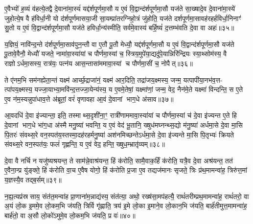 ए॒वैभ्यो॑ ह॒व्यं व॑हत्ये॒तद्वै दे॒वाना॑मा॒स्यं॑ यद्द॑र्\mbox{}शपूर्णमा॒सौ य ए॒वं वि॒द्वान्द॑र्\mbox{}शपूर्णमा॒सौ यज॑ते सा॒ख्षादे॒व दे॒वाना॑मा॒स्ये॑ जुहोत्ये॒ष वै ह॑विर्धा॒नी यो द॑र्\mbox{}शपूर्णमासया॒जी सा॒यम्प्रा॑तरग्निहो॒त्रं जु॑होति॒ यज॑ते दर्\mbox{}शपूर्णमा॒सावह॑रहर्\mbox{}हविर्धा॒निनाꣳ॑ सु॒तो य ए॒वं वि॒द्वान्द॑र्\mbox{}शपूर्णमा॒सौ यज॑ते हविर्धा॒न्य॑स्मीति॒ सर्व॑मे॒वास्य॑ बर्\mbox{}हि॒ष्यं॑ द॒त्तम्भ॑वति दे॒वा वा अहः॑॥३५॥

य॒ज्ञियं॒ नावि॑न्द॒न्ते द॑र्\mbox{}शपूर्णमा॒साव॑पुन॒न्तौ वा ए॒तौ पू॒तौ मेध्यौ॒ यद्द॑र्\mbox{}शपूर्णमा॒सौ य ए॒वं वि॒द्वान्द॑र्\mbox{}शपूर्णमा॒सौ यज॑ते पू॒तावे॒वैनौ॒ मेध्यौ॑ यजते॒ नामा॑वा॒स्या॑यां च पौर्णमा॒स्यां च॒ स्त्रिय॒मुपे॑या॒द्यदु॑पे॒यान्निरि॑न्द्रियः स्या॒थ्सोम॑स्य॒ वै राज्ञोऽर्धमा॒सस्य॒ रात्र॑यः॒ पत्न॑य आस॒न्तासा॑ममावा॒स्यां च पौर्णमा॒सीं च॒ नोपैत्॥३६॥

ते ए॑नम॒भि सम॑नह्येता॒न्तं यक्ष्म॑ आर्च्छ॒द्राजा॑नं॒ यक्ष्म॑ आर॒दिति॒ तद्रा॑जय॒क्ष्मस्य॒ जन्म॒ यत्पापी॑या॒नभ॑व॒त्त- त्पा॑पय॒क्ष्मस्य॒ यज्जा॒याभ्या॒मवि॑न्द॒त्तज्जा॒येन्य॑स्य॒ य ए॒वमे॒तेषां॒ यक्ष्मा॑णां॒ जन्म॒ वेद॒ नैन॑मे॒ते यक्ष्मा॑ विन्दन्ति॒ स ए॒ते ए॒व न॑म॒स्यन्नुपा॑धाव॒त्ते अ॑ब्रूतां॒ वरं॑ वृणावहा आ॒वं दे॒वानां भाग॒धे अ॑साव॥३७॥

आ॒वदधि॑ दे॒वा इ॑ज्यान्ता॒ इति॒ तस्माथ्स॒दृशी॑ना॒ꣳ॒ रात्री॑णाममावा॒स्या॑यां च पौर्णमा॒स्यां च॑ दे॒वा इ॑ज्यन्त ए॒ते हि दे॒वानां भाग॒धे भा॑ग॒धा अ॑स्मै मनु॒ष्या॑ भवन्ति॒ य ए॒वं वेद॑ भू॒तानि॒ ख्षुध॑मघ्नन्थ्स॒द्यो म॑नु॒ष्या॑ अर्धमा॒से दे॒वा मा॒सि पि॒तरः॑ संवथ्स॒रे वन॒स्पत॑य॒स्तस्मा॒दह॑रहर्मनु॒ष्या॑ अश॑नमिच्छन्तेऽर्धमा॒से दे॒वा इ॑ज्यन्ते मा॒सि पि॒तृभ्यः॑ क्रियते संवथ्स॒रे वन॒स्पत॑यः॒ फलं॑ गृह्णन्ति॒ य ए॒वं वेद॒ हन्ति॒ ख्षुध॒म्भ्रातृ॑व्यम्॥३८॥

{\anuvakamend[{प॒श्य॒ति॒ ताभ्या॒मह॑रैदसाव॒ फलꣳ॑ स॒प्त च॑॥६॥}]}

दे॒वा वै नर्चि न यजु॑ष्यश्रयन्त॒ ते साम॑न्ने॒वाश्र॑यन्त॒ हिं क॑रोति॒ सामै॒वाक॒र्\mbox{}हिं क॑रोति॒ यत्रै॒व दे॒वा अश्र॑यन्त॒ तत॑ ए॒वैना॒न्प्र यु॑ङ्क्ते॒ हिं क॑रोति वा॒च ए॒वैष योगो॒ हिं क॑रोति प्र॒जा ए॒व तद्यज॑मानः सृजते॒ त्रिः प्र॑थ॒मामन्वा॑ह॒ त्रिरु॑त्त॒मां य॒ज्ञस्यै॒व तद्ब॒र्\mbox{}सम्॥३९॥

न॒ह्य॒त्यप्र॑स्रसाय॒ संत॑त॒मन्वा॑ह प्रा॒णाना॑म॒न्नाद्य॑स्य॒ संत॑त्या॒ अथो॒ रख्ष॑सा॒मप॑हत्यै॒ राथं॑तरीम्प्रथ॒मामन्वा॑ह॒ राथं॑तरो॒ वा अ॒यं लो॒क इ॒ममे॒व लो॒कम॒भि ज॑यति॒ त्रिर्वि गृ॑ह्णाति॒ त्रय॑ इ॒मे लो॒का इ॒माने॒व लो॒कान॒भि ज॑यति॒ बार्\mbox{}ह॑तीमुत्त॒मामन्वा॑ह॒ बार्\mbox{}ह॑तो॒ वा अ॒सौ लो॒को॑ऽमुमे॒व लो॒कम॒भि ज॑यति॒ प्र वः॑॥४०॥

